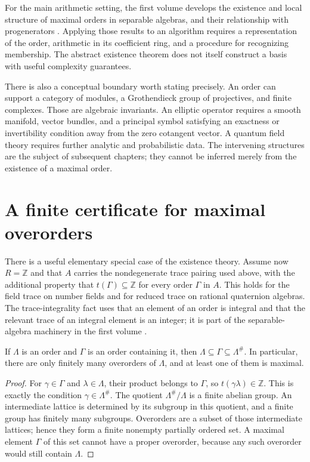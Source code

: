 For the main arithmetic setting, the first volume develops the
existence and local structure of maximal orders in separable
algebras, and their relationship with progenerators
\cite[Ch.~IV]{RoggenkampHuberDyson1970}. Applying those results to
an algorithm requires a representation of the order, arithmetic in
its coefficient ring, and a procedure for recognizing membership.
The abstract existence theorem does not itself construct a basis
with useful complexity guarantees.

There is also a conceptual boundary worth stating precisely. An
order can support a category of modules, a Grothendieck group of
projectives, and finite complexes. Those are algebraic invariants.
An elliptic operator requires a smooth manifold, vector bundles,
and a principal symbol satisfying an exactness or invertibility
condition away from the zero cotangent vector. A quantum field
theory requires further analytic and probabilistic data. The
intervening structures are the subject of subsequent chapters;
they cannot be inferred merely from the existence of a maximal
order.

\section{A finite certificate for maximal overorders}

There is a useful elementary special case of the existence theory.
Assume now $R=\mathbb Z$ and that $A$ carries the nondegenerate
trace pairing used above, with the additional property that
$t(\Gamma)\subseteq\mathbb Z$ for every order $\Gamma$ in $A$.
This holds for the field trace on number fields and for reduced
trace on rational quaternion algebras. The trace-integrality fact
uses that an element of an order is integral and that the relevant
trace of an integral element is an integer; it is part of the
separable-algebra machinery in the first volume
\cite[III, \S6; IV, Theorem~1.4]{RoggenkampHuberDyson1970}.

\begin{proposition}
If $\Lambda$ is an order and $\Gamma$ is an order containing it,
then $\Lambda\subseteq\Gamma\subseteq\Lambda^{\#}$. In
particular, there are only finitely many overorders of $\Lambda$,
and at least one of them is maximal.
\end{proposition}

\begin{proof}
For $\gamma\in\Gamma$ and $\lambda\in\Lambda$, their product
belongs to $\Gamma$, so $t(\gamma\lambda)\in\mathbb Z$.
This is exactly the condition $\gamma\in\Lambda^{\#}$.
The quotient $\Lambda^{\#}/\Lambda$ is a finite abelian group.
An intermediate lattice is determined by its subgroup in this
quotient, and a finite group has finitely many subgroups.
Overorders are a subset of those intermediate lattices; hence
they form a finite nonempty partially ordered set. A maximal
element $\Gamma$ of this set cannot have a proper overorder,
because any such overorder would still contain $\Lambda$.
\end{proof}

